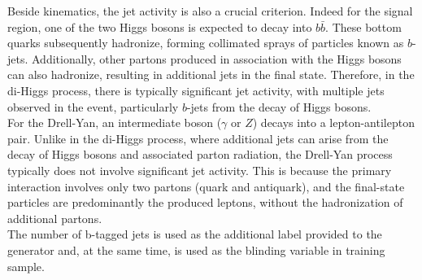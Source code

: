 Beside kinematics, the jet activity is also a crucial criterion. Indeed for the signal region, one of the two Higgs bosons is expected to decay into $b\bar{b}$. These bottom quarks subsequently hadronize, forming collimated sprays of particles known as $b$-jets. Additionally, other partons produced in association with the Higgs bosons can also hadronize, resulting in additional jets in the final state. Therefore, in the di-Higgs process, there is typically significant jet activity, with multiple jets observed in the event, particularly $b$-jets from the decay of Higgs bosons.\\
For the Drell-Yan, an intermediate boson ($\gamma$ or $Z$) decays into a lepton-antilepton pair. Unlike in the di-Higgs process, where additional jets can arise from the decay of Higgs bosons and associated parton radiation, the Drell-Yan process typically does not involve significant jet activity. This is because the primary interaction involves only two partons (quark and antiquark), and the final-state particles are predominantly the produced leptons, without the hadronization of additional partons. \\
The number of b-tagged jets is used as the additional label provided to the generator and, at the same time, is used as the blinding variable in training sample.\\